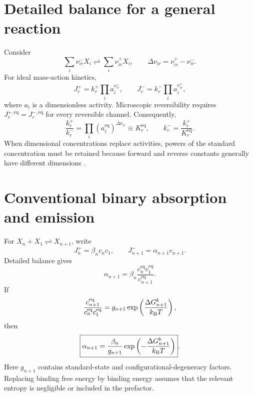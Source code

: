 \documentclass[11pt]{article}
\newcommand{\beq}{\mathrm{eq}}
\begin{document}
\section{Detailed balance for a general reaction}
Consider
\begin{equation}
 \sum_i\nu_{ir}^{-}X_i\rightleftharpoons
 \sum_i\nu_{ir}^{+}X_i,\qquad
 \Delta\nu_{ir}=\nu_{ir}^{+}-\nu_{ir}^{-}.
\end{equation}
For ideal mass-action kinetics,
\begin{equation}
 J_r^{+}=k_r^{+}\prod_i a_i^{\nu_{ir}^{-}},\qquad
 J_r^{-}=k_r^{-}\prod_i a_i^{\nu_{ir}^{+}},
\end{equation}
where \(a_i\) is a dimensionless activity. Microscopic reversibility requires
\(J_r^{+,\beq}=J_r^{-,\beq}\) for every reversible channel. Consequently,
\begin{equation}
 \boxed{\frac{k_r^{+}}{k_r^{-}}
 =\prod_i(a_i^{\beq})^{\Delta\nu_{ir}}\equiv K_r^{\beq}},
 \qquad
 \boxed{k_r^{-}=\frac{k_r^{+}}{K_r^{\beq}}}.
 \label{eq:general-db}
\end{equation}
When dimensional concentrations replace activities, powers of the standard
concentration must be retained because forward and reverse constants generally
have different dimensions \cite{Hill1989,Qian2022}.

\section{Conventional binary absorption and emission}
For \(X_n+X_1\rightleftharpoons X_{n+1}\), write
\[
 J_n^{+}=\beta_nc_nc_1,\qquad
 J_{n+1}^{-}=\alpha_{n+1}c_{n+1}.
\]
Detailed balance gives
\begin{equation}
 \boxed{\alpha_{n+1}
 =\beta_n\frac{c_n^{\beq}c_1^{\beq}}{c_{n+1}^{\beq}}}.
 \label{eq:binary-db}
\end{equation}
If
\[
 \frac{c_{n+1}^{\beq}}{c_n^{\beq}c_1^{\beq}}
 =g_{n+1}\exp\left(\frac{\Delta G_{n+1}^{b}}{k_{\rm B}T}\right),
\]
then
\begin{equation}
 \boxed{\alpha_{n+1}
 =\frac{\beta_n}{g_{n+1}}
 \exp\left(-\frac{\Delta G_{n+1}^{b}}{k_{\rm B}T}\right)}.
\end{equation}
Here \(g_{n+1}\) contains standard-state and configurational-degeneracy
factors. Replacing binding free energy by binding energy assumes that the
relevant entropy is negligible or included in the prefactor.
\end{document}
